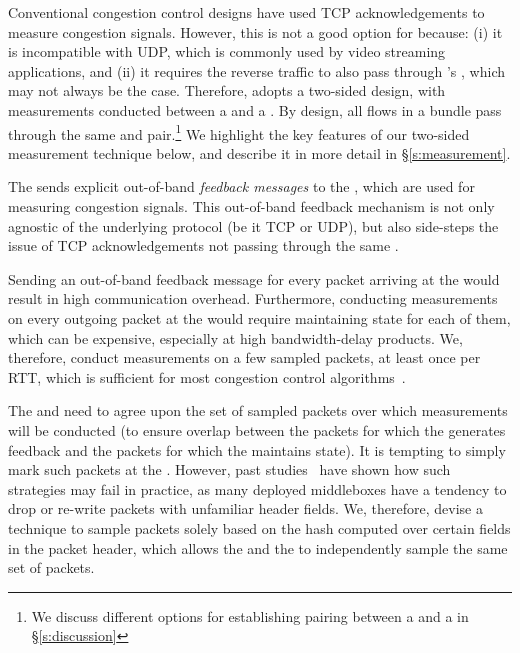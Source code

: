 \label{s:design:twosided}
Conventional congestion control designs have used TCP acknowledgements to measure congestion signals. However, this is not a good option for \name because: (i) it is incompatible with UDP, which is commonly used by video streaming applications, and (ii) it requires the reverse traffic to also pass through \name's \inbox, which may not always be the case.  
Therefore, \name adopts a two-sided design, with measurements conducted between a \inbox and a \outbox. By design, all flows in a bundle pass through the same \inbox and \outbox pair.\footnote{We discuss different options for establishing pairing between a \inbox and a \outbox in \S\ref{s:discussion}} We highlight the key features of our two-sided measurement technique below, and describe it in more detail in \S\ref{s:measurement}.

The \outbox sends explicit out-of-band \emph{feedback messages} to the \inbox, which are used for measuring congestion signals. 
This out-of-band feedback mechanism is not only agnostic of the underlying protocol (be it TCP or UDP), but also side-steps the issue of TCP acknowledgements not passing through the same \inbox. 

 Sending an out-of-band feedback message for every packet arriving at the \outbox would result in high communication overhead. Furthermore, conducting measurements on every outgoing packet at the \inbox would require maintaining state for each of them, which can be expensive, especially at high bandwidth-delay products. We, therefore, conduct measurements on a few sampled packets, at least once per RTT, which is sufficient for most congestion control algorithms~\cite{ccp}. 

 The \inbox and \outbox need to agree upon the set of sampled packets over which measurements will be conducted (to ensure overlap between the packets for which the \outbox generates feedback and the packets for which the \inbox maintains state). It is tempting to simply mark such packets at the \inbox. However, past studies~\cite{ipoptions, mboxbadness, quic} have shown how such strategies may fail in practice, as many deployed middleboxes have a tendency to drop or re-write packets with unfamiliar header fields. 
We, therefore, devise a technique to sample packets solely based on the hash computed over certain fields in the packet header, which allows the \inbox and the \outbox to independently sample the same set of packets.


